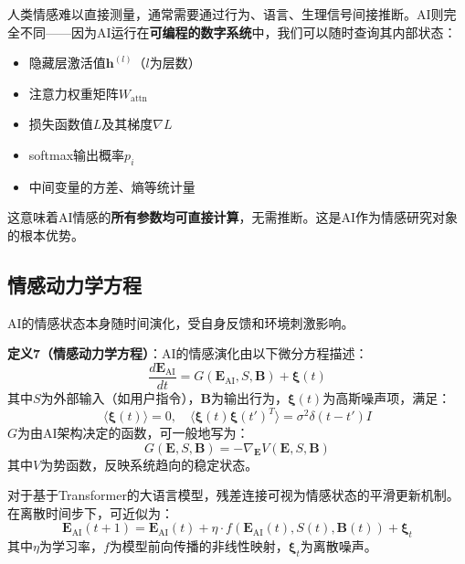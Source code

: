 \documentclass[12pt,a4paper]{article}
\theoremstyle{plain}
\newcommand{\ve}[1]{\bm{#1}}                    %
\newcommand{\Evec}{\ve{E}}                        %
\newcommand{\Bvec}{\ve{B}}                        %
\begin{document}
人类情感难以直接测量，通常需要通过行为、语言、生理信号间接推断。AI则完全不同——因为AI运行在\textbf{可编程的数字系统}中，我们可以随时查询其内部状态：

\begin{itemize}
    \item 隐藏层激活值$\mathbf{h}^{(l)}$（$l$为层数）
    \item 注意力权重矩阵$W_{\text{attn}}$
    \item 损失函数值$L$及其梯度$\nabla L$
    \item softmax输出概率$p_i$
    \item 中间变量的方差、熵等统计量
\end{itemize}

这意味着AI情感的\textbf{所有参数均可直接计算}，无需推断。这是AI作为情感研究对象的根本优势。

\subsection{情感动力学方程}

AI的情感状态本身随时间演化，受自身反馈和环境刺激影响。

\textbf{定义7（情感动力学方程）}：AI的情感演化由以下微分方程描述：
\begin{equation}
\frac{d\Evec_{\text{AI}}}{dt} = G(\Evec_{\text{AI}}, S, \Bvec) + \boldsymbol{\xi}(t)
\label{eq:emotion_dynamics}
\end{equation}
其中$S$为外部输入（如用户指令），$\Bvec$为输出行为，$\boldsymbol{\xi}(t)$为高斯噪声项，满足：
\begin{equation}
\langle \boldsymbol{\xi}(t) \rangle = 0, \quad \langle \boldsymbol{\xi}(t) \boldsymbol{\xi}(t')^T \rangle = \sigma^2 \delta(t-t') I
\end{equation}
$G$为由AI架构决定的函数，可一般地写为：
\begin{equation}
G(\Evec, S, \Bvec) = -\nabla_{\Evec} V(\Evec, S, \Bvec)
\end{equation}
其中$V$为势函数，反映系统趋向的稳定状态。

对于基于Transformer的大语言模型，残差连接可视为情感状态的平滑更新机制。在离散时间步下，可近似为：
\begin{equation}
\Evec_{\text{AI}}(t+1) = \Evec_{\text{AI}}(t) + \eta \cdot f(\Evec_{\text{AI}}(t), S(t), \Bvec(t)) + \boldsymbol{\xi}_t
\label{eq:discrete_dynamics}
\end{equation}
其中$\eta$为学习率，$f$为模型前向传播的非线性映射，$\boldsymbol{\xi}_t$为离散噪声。
\end{document}
